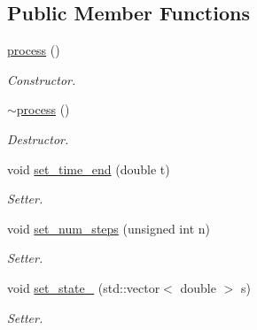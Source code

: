 \subsection*{Public Member Functions}
\begin{DoxyCompactItemize}
\item 
\mbox{\label{classprocess_a59faea64773f0619162d80135c334c80}} 
\mbox{\hyperlink{classprocess_a59faea64773f0619162d80135c334c80}{process}} ()
\begin{DoxyCompactList}\small\item\em Constructor. \end{DoxyCompactList}\item 
\mbox{\label{classprocess_af5f38b7ec02665033d47936fec5c498d}} 
\mbox{\hyperlink{classprocess_af5f38b7ec02665033d47936fec5c498d}{$\sim$process}} ()
\begin{DoxyCompactList}\small\item\em Destructor. \end{DoxyCompactList}\item 
\mbox{\label{classprocess_aaf36acd58fc1d875a6b1ad9e3000c9f9}} 
void \mbox{\hyperlink{classprocess_aaf36acd58fc1d875a6b1ad9e3000c9f9}{set\+\_\+time\+\_\+end}} (double t)
\begin{DoxyCompactList}\small\item\em Setter. \end{DoxyCompactList}\item 
\mbox{\label{classprocess_a479e9c720b3fb9a9e900a1dc6e85b7b8}} 
void \mbox{\hyperlink{classprocess_a479e9c720b3fb9a9e900a1dc6e85b7b8}{set\+\_\+num\+\_\+steps}} (unsigned int n)
\begin{DoxyCompactList}\small\item\em Setter. \end{DoxyCompactList}\item 
\mbox{\label{classprocess_a1c1550dc3afc293860934496a3239a62}} 
void \mbox{\hyperlink{classprocess_a1c1550dc3afc293860934496a3239a62}{set\+\_\+state\+\_}} (std\+::vector$<$ double $>$ s)
\begin{DoxyCompactList}\small\item\em Setter. \end{DoxyCompactList}\item 

\end{DoxyCompactItemize}
